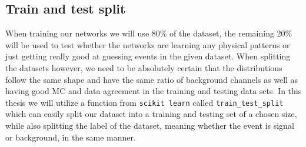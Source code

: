 \documentclass[12pt, a4paper]{book}
\begin{document}
\subsection{Train and test split}\label{sec:train_test}
When training our networks we will use 80\% of the dataset, the remaining 20\% will be used to test whether the networks are learning any physical patterns or just getting really good at guessing events in the given dataset. When splitting the datasets however, we need to be absolutely certain that the distributions 
follow the same shape and have the same ratio of background channels as well as having good MC and data agreement in the training and testing data sets. In this thesis we will utilize a function from \verb|scikit learn| \cite{scikit-learn} called \verb|train_test_split| which can easily split our dataset into 
a training and testing set of a chosen size, while also splitting the label of the dataset, meaning whether the event is signal or background, in the same manner.
\graphicspath{{../../../Plots/Data_Analysis/train_test_split/}}
\end{document}
